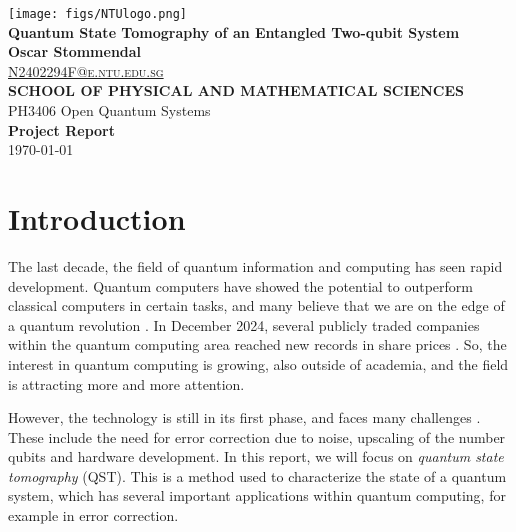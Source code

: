 \documentclass[a4paper,12pt]{article}
\begin{document}
\begin{titlepage}
    \begin{center}
        \texttt{[image: figs/NTUlogo.png]} 
        \\[2cm]
        
        {\huge \textbf{Quantum State Tomography of an Entangled Two-qubit System}} 
        \\[2cm]
        
        {\large \textbf{Oscar Stommendal}} 
        \\[0.2cm]
        
        {\large \href{mailto:N2402294F@e.ntu.edu.sg}{\textsc{N2402294F@e.ntu.edu.sg}}}
        \\[2cm]
        
        {\textbf{SCHOOL OF PHYSICAL AND MATHEMATICAL SCIENCES}} 
        \\[2cm]
        
        {\Large PH3406 Open Quantum Systems} 
        \\[0.5cm]
        
        {\Large \textbf{Project Report}} 
        \\[2cm]

        \vfill
        {\Large \today}
    \end{center}
\end{titlepage}

\section{Introduction}
The last decade, the field of quantum information and computing has seen rapid development. Quantum computers have showed the potential to outperform classical computers in certain tasks, and many believe that we are on the edge of a quantum revolution \cite{outperform} \cite{revolution}. In December 2024, several publicly traded companies within the quantum computing area reached new records in share prices \cite{rocket}. So, the interest in quantum computing is growing, also outside of academia, and the field is attracting more and more attention. 

However, the technology is still in its first phase, and faces many challenges \cite{challenge}. These include the need for error correction due to noise, upscaling of the number qubits and hardware development. In this report, we will focus on \textit{quantum state tomography} (QST). This is a method used to characterize the state of a quantum system, which has several important applications within quantum computing, for example in error correction.
\end{document}
